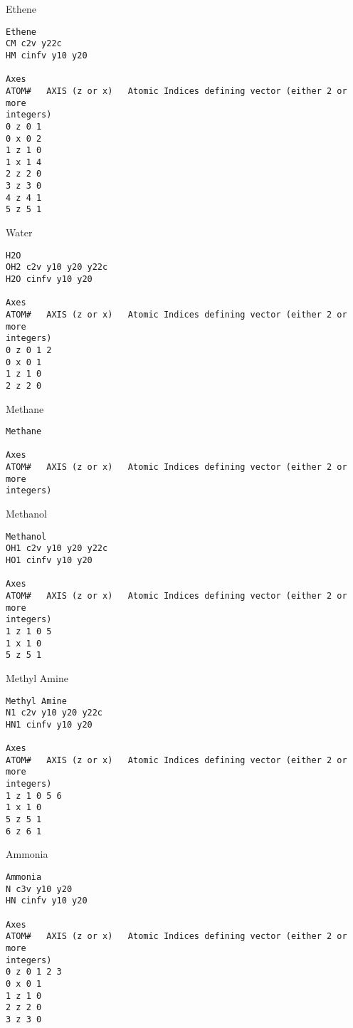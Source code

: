\begin{subsection}{Ethene}
\begin{verbatim}
Ethene
CM c2v y22c
HM cinfv y10 y20

Axes
ATOM#   AXIS (z or x)   Atomic Indices defining vector (either 2 or more
integers)
0 z 0 1
0 x 0 2
1 z 1 0
1 x 1 4
2 z 2 0
3 z 3 0
4 z 4 1
5 z 5 1
\end{verbatim}
\end{subsection}
\begin{subsection}{Water}
\begin{verbatim}
H2O
OH2 c2v y10 y20 y22c
H2O cinfv y10 y20

Axes
ATOM#   AXIS (z or x)   Atomic Indices defining vector (either 2 or more
integers)
0 z 0 1 2
0 x 0 1
1 z 1 0
2 z 2 0
\end{verbatim}
\end{subsection}
\begin{subsection}{Methane}
\begin{verbatim}
Methane

Axes
ATOM#   AXIS (z or x)   Atomic Indices defining vector (either 2 or more
integers)
\end{verbatim}
\end{subsection}
\begin{subsection}{Methanol}
\begin{verbatim}
Methanol
OH1 c2v y10 y20 y22c
HO1 cinfv y10 y20

Axes
ATOM#   AXIS (z or x)   Atomic Indices defining vector (either 2 or more
integers)
1 z 1 0 5
1 x 1 0
5 z 5 1
\end{verbatim}
\end{subsection}
\begin{subsection}{Methyl Amine}
\begin{verbatim}
Methyl Amine
N1 c2v y10 y20 y22c
HN1 cinfv y10 y20

Axes
ATOM#   AXIS (z or x)   Atomic Indices defining vector (either 2 or more
integers)
1 z 1 0 5 6
1 x 1 0
5 z 5 1
6 z 6 1
\end{verbatim}
\end{subsection}
\begin{subsection}{Ammonia}
\begin{verbatim}
Ammonia
N c3v y10 y20
HN cinfv y10 y20

Axes
ATOM#   AXIS (z or x)   Atomic Indices defining vector (either 2 or more
integers)
0 z 0 1 2 3
0 x 0 1
1 z 1 0
2 z 2 0
3 z 3 0

\end{verbatim}
\end{subsection}
